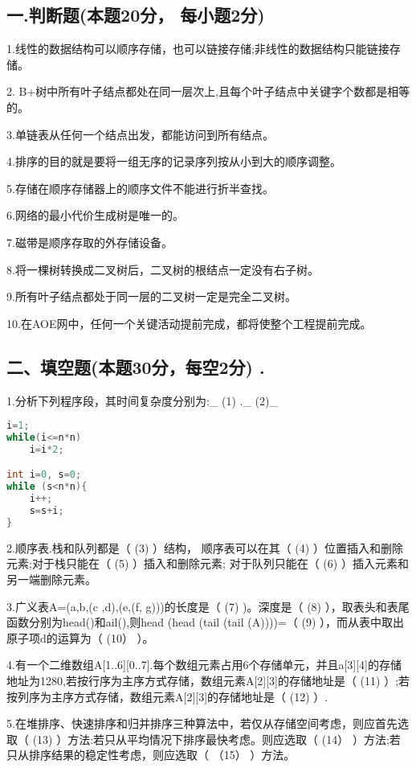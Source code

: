 
\subsection{一.判断题(本题20分， 每小题2分)}

1.线性的数据结构可以顺序存储，也可以链接存储;非线性的数据结构只能链接存储。

2. B+树中所有叶子结点都处在同一层次上,且每个叶子结点中关键字个数都是相等的。

3.单链表从任何一个结点出发，都能访问到所有结点。

4.排序的目的就是要将一组无序的记录序列按从小到大的顺序调整。

5.存储在顺序存储器上的顺序文件不能进行折半查找。

6.网络的最小代价生成树是唯一的。

7.磁带是顺序存取的外存储设备。

8.将一棵树转换成二叉树后，二叉树的根结点一定没有右子树。

9.所有叶子结点都处于同一层的二叉树一定是完全二叉树。

10.在AOE网中，任何一个关键活动提前完成，都将使整个工程提前完成。

\subsection{二、填空题(本题30分，每空2分) .}

1.分析下列程序段，其时间复杂度分别为:\_ (1) .\_ (2)\_
\begin{lstlisting}[language=cpp]
i=1;
while(i<=n*n)
    i=i*2;

int i=0, s=0;
while (s<n*n){
    i++;
    s=s+i;
}
\end{lstlisting}

2.顺序表.栈和队列都是（ (3) ）结构， 顺序表可以在其（ (4) ）位置插入和删除元素;对于栈只能在（ (5) ）插入和删除元素; 对于队列只能在（ (6) ）插入元素和另一端删除元素。

3.广义表A=(a,b,(c ,d),(e,(f, g)))的长度是（ (7) )。深度是（ (8) ），取表头和表尾函数分别为head()和ail(),则head (head (tail (tail (A))))=（ (9) ），而从表中取出原子项d的运算为（ (10） ）。

4.有一个二维数组A[1..6][0..7].每个数组元素占用6个存储单元，并且a[3][4]的存储地址为1280,若按行序为主序方式存储，数组元素A[2][3]的存储地址是（ (11) ）;若按列序为主序方式存储，数组元素A[2][3]的存储地址是（ (12) ）.

5.在堆排序、快速排序和归并排序三种算法中，若仅从存储空间考虑，则应首先选取（ (13) ）方法:若只从平均情况下排序最快考虑。则应选取（ (14） ）方法;若只从排序结果的稳定性考虑，则应选取（ （15） ）方法。

